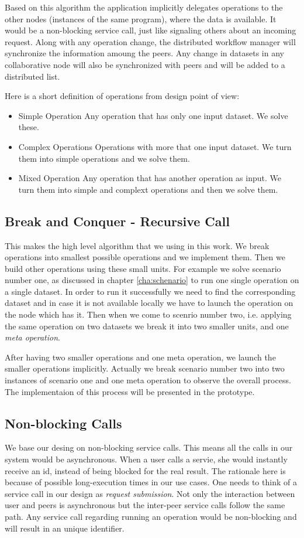 Based on this algorithm the application implicitly delegates operations to the other 
nodes (instances of the same program), where the data is available. 
It would be a non-blocking service call, 
just like signaling others about an incoming request.
Along with any operation change, the distributed workflow manager will synchronize the information amoung the peers.
Any change in datasets in any collaborative node will also be synchronized with peers and will be added to 
a distributed list.

Here is a short definition of operations from design point of view:

\begin{itemize}
\item{Simple Operation} Any operation that has only one input dataset. We solve these.
\item{Complex Operations} Operations with more that one input dataset. We turn them into simple operations and we solve them.
\item{Mixed Operation} Any operation that has another operation as input. We turn them into simple and complext operations and
then we solve them.
\end{itemize}

\subsection{Break and Conquer - Recursive Call}
This makes the high level algorithm that we using in this work. We break operations into smallest possible operations
and we implement them. Then we build other operations using these small units. For example we solve scenario number one, as
discussed in chapter \ref{cha:schenario} to run one single operation on a single dataset.
In order to run it successfully we need to find the corresponding dataset and in case it is not available locally we have
to launch the operation on the node which has it. Then when we come to scenrio number two, i.e. applying the same operation
on two datasets we break it into two smaller units, and one \textit{meta operation}.

After having two smaller operations and one meta operation, we launch the smaller operations implicitly. Actually we break
scenario number two into two instances of scenario one and one meta operation to observe the overall process. The implementaion
of this process will be presented in the prototype.

\subsection{Non-blocking Calls}
We base our desing on non-blocking service calls. This means all the calls in our system would be asynchronous.
When a user calls a servie, she would instantly receive an id, instead of being blocked for the real result.
The rationale here is because of possible long-execution times in our use cases. 
One needs to think of a service call in our design as \textit{request submission}. 
Not only the interaction between user and peers is asynchronous but the inter-peer service calls follow the same path.
Any service call regarding running an operation would be non-blocking and will result in an unique identifier.

